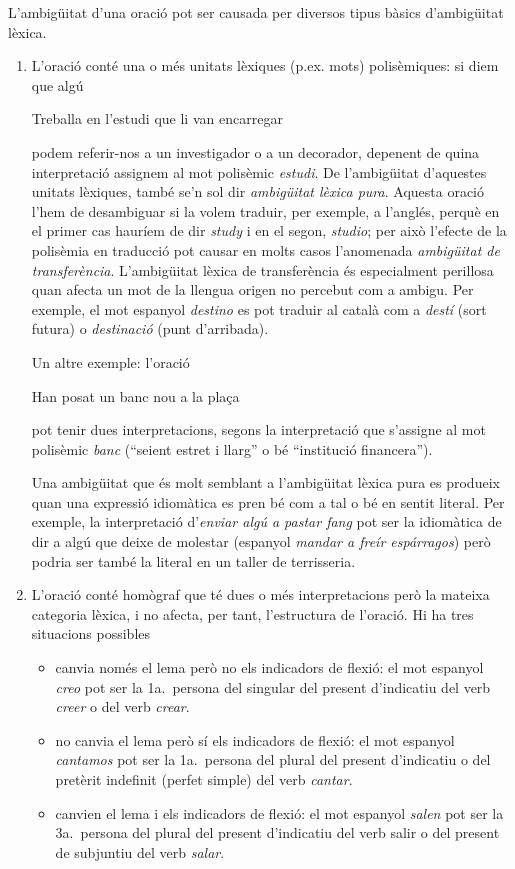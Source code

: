 L'ambigüitat d'una oració pot ser causada per diversos tipus bàsics
d'ambigüitat lèxica.
\begin{enumerate}
\item L'oració conté una o més unitats lèxiques (p.ex. mots)
  polisèmiques: si diem que algú 
\begin{exemple}
Treballa en l'estudi que li van
    encarregar
\end{exemple} podem referir-nos a un investigador o a un decorador, depenent de
  quina interpretació  assignem al mot polisèmic \emph{estudi}. De
  l'ambigüitat d'aquestes unitats lèxiques, també se'n sol dir {\em
    ambigüitat lèxica pura}.  Aquesta oració l'hem de desambiguar si
  la volem traduir, per exemple, a l'anglés, perquè en el primer cas
  hauríem de dir \emph{study} i en el segon, \emph{studio}; per això
  l'efecte de la polisèmia en traducció pot causar en molts casos l'anomenada {\em
    ambigüitat de transferència}.  L'ambigüitat lèxica de
  transferència és especialment perillosa quan afecta un mot de la
  llengua origen no percebut com a ambigu. Per exemple, el mot
  espanyol \emph{destino} es pot traduir al català com a {\em
    destí} (sort futura) o \emph{destinació} (punt d'arribada).
  
  Un altre exemple: l'oració 
\begin{exemple}
 Han posat un banc nou a la plaça
\end{exemple}
pot tenir dues interpretacions, segons la interpretació que s'assigne
al mot polisèmic \emph{banc} (``seient estret i llarg'' o bé
``institució financera'').
  
Una ambigüitat que és molt semblant a l'ambigüitat lèxica pura es
produeix quan una expressió idiomàtica es pren bé com a tal o bé en
sentit literal. Per exemple, la interpretació d'\emph{enviar algú a pastar
fang} pot ser la idiomàtica de dir a algú que deixe de molestar
(espanyol \emph{mandar a freír espárragos}) però podria ser també la
literal en un taller de terrisseria.
  
\item L'oració conté homògraf que té dues o
  més interpretacions però la mateixa categoria lèxica, i no afecta,
  per tant, l'estructura de l'oració. Hi ha tres situacions possibles
  \begin{itemize}
  \item canvia només el lema però no els indicadors de flexió: el
    mot espanyol \emph{creo} pot ser la 1a.\ persona del singular del
    present d'indicatiu del verb \emph{creer} o del verb \emph{crear}.
  \item no canvia el lema però sí els indicadors de flexió: el mot
    espanyol \emph{cantamos} pot ser la 1a.\ persona del plural del
    present d'indicatiu o del pretèrit indefinit (perfet simple) del
    verb \emph{cantar}.
  \item canvien el lema i els indicadors de flexió: el mot espanyol
    \emph{salen} pot ser la 3a.\ persona del plural del present
    d'indicatiu del verb salir o del present de subjuntiu del verb
    \emph{salar}.
  \end{itemize}
  

\end{enumerate}
